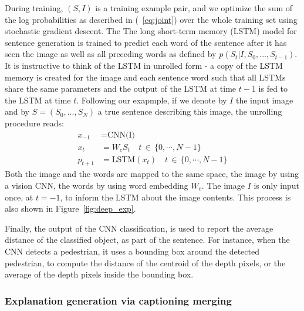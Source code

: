 During training, $(S, I)$ is a training example pair, and we optimize the sum of the log probabilities as described in (~\ref{eq:joint}) over the whole training set using stochastic gradient descent.
The The long short-term memory (LSTM) model for sentence generation is trained to predict each word of the sentence after it has seen the image as well as all preceding words as defined by $p(S_t|I, S_0, . . . , S_{t-1})$.
It is instructive to think of the LSTM in unrolled form - a copy of the LSTM memory is created for the image and each sentence word such that all LSTMs share the same parameters and the output of the LSTM at time $t-1$ is fed to the LSTM at time $t$.
Following our exapmple, if we denote by $I$ the input image and by $S = (S_0, . . . , S_N )$ a true sentence describing this image, the unrolling procedure reads:
\begin{align}
    x_{-1} &= \text{CNN(I)} \\
    x_t &= W_e S_t \quad t \, \in \, \{0, \cdots, N-1 \} \\
    p_{t+1} &= \text{LSTM}(x_t)  \quad t \, \in \, \{0, \cdots, N-1 \}
\end{align}
Both the image and the words are mapped to the same space, the image by using a vision CNN, the words by using word embedding $W_e$.
The image $I$ is only input once, at $t = -1$, to inform the LSTM about the image contents. This process is also shown in Figure~\ref{fig:deep_exp}.

Finally, the output of the CNN classification, is used to report the average distance of the classified object, as part of the sentence. For instance, when the CNN detects a pedestrian, it uses a bounding box around the detected pedestrian, to compute the distance of the centroid of the depth pixels, or the average of the depth pixels inside the bounding box. 

\subsubsection{Explanation generation via captioning merging}
\label{subsec:explain}

